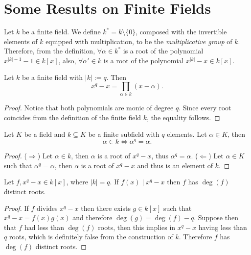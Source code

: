 \section{Some Results on Finite Fields}

\begin{definition}
    Let \(k\) be a finite field. We define \(k^\ast = k \setminus \{0\}\),
    composed with the invertible elements of \(k\) equipped with multiplication,
    to be the \emph{multiplicative group} of \(k\). Therefore, from the
    definition, \(\forall \alpha \in k^\ast\) is a root of the polynomial
    \(x^{|k|-1} - 1 \in k[x]\), also, \(\forall \alpha' \in k\) is a root of the
    polynomial \(x^{|k|} - x \in k[x]\).
\end{definition}

\begin{proposition}
    Let \(k\) be a finite field with \(|k| := q\). Then
    \[
        x^{q} - x = \prod_{\alpha \in k} (x-\alpha).
    \]
\end{proposition}

\begin{proof}
    Notice that both polynomials are monic of degree \(q\). Since every root
    coincides from the definition of the finite field \(k\), the equality
    follows.
\end{proof}

\begin{corollary}
    Let \(K\) be a field and \(k \subseteq K\) be a finite subfield with \(q\)
    elements. Let \(\alpha \in K\), then
    \[
        \alpha \in k \Leftrightarrow \alpha^q = \alpha.
    \]
\end{corollary}

\begin{proof}
    (\(\Rightarrow\)) Let \(\alpha \in k\), then \(\alpha\) is a root of \(x^q -
    x\), thus \(\alpha^q = \alpha\). (\(\Leftarrow\)) Let \(\alpha \in K\) such
    that \(\alpha^q = \alpha\), then \(\alpha\) is a root of \(x^q - x\) and thus
    is an element of \(k\).
\end{proof}

\begin{corollary}
    Let \(f, x^q - x \in k[x]\), where \(|k| = q\). If \(f(x) \mid x^q - x\) then
    \(f\) has \(\deg(f)\) distinct roots.
\end{corollary}

\begin{proof}
    If \(f\) divides  \(x^q - x\) then there exists \(g \in k[x]\) such that
    \(x^q - x = f(x)g(x)\) and therefore \(\deg(g) = \deg(f) - q\). Suppose then
    that \(f\) had less than \(\deg(f)\) roots, then this implies in  \(x^q - x\)
    having less than \(q\) roots, which is definitely false from the
    construction of \(k\). Therefore \(f\) has \(\deg(f)\) distinct roots.
\end{proof}

